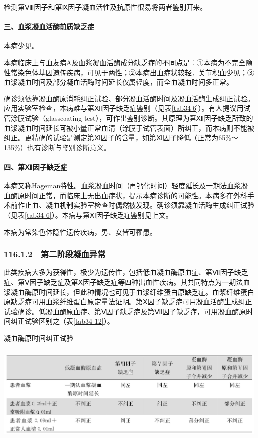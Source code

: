 检测第Ⅷ因子和第Ⅸ因子凝血活性及抗原性很易将两者鉴别开来。

\paragraph{三、血浆凝血活酶前质缺乏症}

本病少见。

本病临床上与血友病A及血浆凝血活酶成分缺乏症的不同点是：①本病为不完全隐性常染色体基因遗传疾病，可见于两性；②本病出血症状较轻，关节积血少见；③血浆凝血时间及部分凝血活酶时间延长仅属轻度，而全血凝血时间多正常。

确诊须依靠凝血酶原消耗纠正试验、部分凝血活酶时间及凝血活酶生成纠正试验。应用实验室检查，本病难与第Ⅻ因子缺乏症鉴别（见表\ref{tab34-6}）。有人提议用试管涂膜试验（glasscoating
test），可作出鉴别诊断。其原理为第Ⅻ因子缺乏所致的血浆凝血时间延长可被小量正常血清（涂膜于试管表面）所纠正，而本病则不能被纠正。更精确的试验是测定第Ⅺ因子的含量，如第Ⅺ因子降低（正常为65\%～135\%）也有诊断与鉴别诊断意义。

\paragraph{四、第Ⅻ因子缺乏症}

本病又称Hageman特性。血浆凝血时间（再钙化时间）轻度延长及一期法血浆凝血酶原时间正常，而临床上无出血症状，提示本病诊断的可能性。本病多在外科手术前作止血、凝血机制实验室检查时偶然被发现。确诊须靠凝血活酶生成纠正试验（见表\ref{tab34-6}）。本病与第Ⅺ因子缺乏症鉴别见上文。

本病为常染色体隐性遗传疾病，男、女皆可罹患。

\subsubsection{116.1.2　第二阶段凝血异常}

此类疾病大多为获得性，极少为遗传性，包括低血凝血酶原血症、第Ⅶ因子缺乏症、第Ⅴ因子缺乏症及第Ⅹ因子缺乏症等四种出血性疾病。其共同特点为一期法血浆凝血酶原时间延长，但此种情况也可见于血浆纤维蛋白原缺乏症。血浆纤维蛋白原缺乏症可用血浆纤维蛋白原定量法证明。第Ⅹ因子缺乏症可用凝血活酶生成纠正试验确诊。低凝血酶原血症、第Ⅴ因子缺乏症及第Ⅶ因子缺乏症，可用凝血酶原时间纠正试验区别之（表\ref{tab34-12}）。

\begin{table}[htbp]
\centering
\caption{凝血酶原时间纠正试验}
\label{tab34-12}
\includegraphics[width=5.9375in,height=1.875in]{./images/Image00207.jpg}
\end{table}

